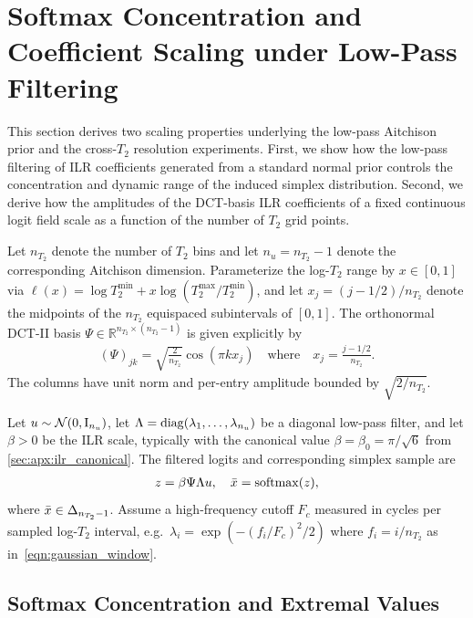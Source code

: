 \section{Softmax Concentration and Coefficient Scaling under Low-Pass Filtering}\label{sec:apx:simplex_distributions_asymptotics}

This section derives two scaling properties underlying the low-pass Aitchison prior and the cross-$T_2$ resolution experiments.
First, we show how the low-pass filtering of \gls*{ILR} coefficients generated from a standard normal prior controls the concentration and dynamic range of the induced simplex distribution.
Second, we derive how the amplitudes of the \gls*{DCT}-basis \gls*{ILR} coefficients of a fixed continuous logit field scale as a function of the number of $T_2$ grid points.

Let $n_{T_2}$ denote the number of $T_2$ bins and let $n_u = n_{T_2} - 1$ denote the corresponding Aitchison dimension.
Parameterize the log-$T_2$ range by $x \in [0, 1]$ via $\ell(x) = \log T_2^{\min} + x \log(T_2^{\max} / T_2^{\min})$, and let $x_j = (j - 1/2) / n_{T_2}$ denote the midpoints of the $n_{T_2}$ equispaced subintervals of $[0, 1]$.
The orthonormal \gls*{DCT}-II basis $\Psi \in \mathbb{R}^{n_{T_2} \times (n_{T_2} - 1)}$ is given explicitly by
\begin{align}\label{eqn:apx:cross_res_psi_def}
    (\Psi)_{jk} = \sqrt{\frac{2}{n_{T_2}}} \cos\left(\pi k x_j\right) \quad \text{where} \quad x_j = \frac{j - 1/2}{n_{T_2}}.
\end{align}
The columns have unit norm and per-entry amplitude bounded by $\sqrt{2 / n_{T_2}}$.

Let $u \sim \mathcal{N}(\mathrm{0}, \mathrm{I}_{n_u})$, let $\Lambda = \Diag{\lambda_1,\ldots,\lambda_{n_u}}$ be a diagonal low-pass filter, and let $\beta > 0$ be the \gls*{ILR} scale, typically with the canonical value $\beta = \beta_{0} = \pi/\sqrt{6}$ from \cref{sec:apx:ilr_canonical}.
The filtered logits and corresponding simplex sample are
\begin{align}\label{eqn:apx:low_pass_ilr_transform}
    z = \beta \Psi \Lambda u, \quad \bar{x} = \operatorname{softmax}(z),
\end{align}
where $\bar{x} \in \Delta_{n_{T_2} - 1}$.
Assume a high-frequency cutoff $F_c$ measured in cycles per sampled log-$T_2$ interval, e.g.\ $\lambda_i = \exp( -(f_i / F_c)^2 / 2 )$ where $f_i = i/n_{T_2}$ as in~\cref{eqn:gaussian_window}.

\subsection{Softmax Concentration and Extremal Values}

